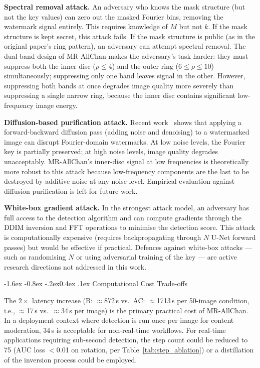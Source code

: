 \documentclass[10pt,twocolumn]{article}
\makeatletter
\renewcommand\subsection{\@startsection{subsection}{2}{\z@}%
  {-1.6ex \@plus -0.8ex \@minus -.2ex}{0.4ex \@plus .1ex}%
  {\normalfont\normalsize\itshape}}
\makeatother
\begin{document}
\textbf{Spectral removal attack.}
An adversary who knows the mask structure (but not the key values) can
zero out the masked Fourier bins, removing the watermark signal entirely.
This requires knowledge of $M$ but not $k$.
If the mask structure is kept secret, this attack fails.
If the mask structure is public (as in the original paper's ring pattern),
an adversary can attempt spectral removal.
The dual-band design of MR-AllChan makes the adversary's task harder:
they must suppress both the inner disc ($\rho \le 4$) and the outer ring
($6 \le \rho \le 10$) simultaneously; suppressing only one band leaves
signal in the other.
However, suppressing both bands at once degrades image quality more
severely than suppressing a single narrow ring, because the inner disc
contains significant low-frequency image energy.

\textbf{Diffusion-based purification attack.}
Recent work~\cite{zhao2023invisible} shows that applying a forward-backward
diffusion pass (adding noise and denoising) to a watermarked image can
disrupt Fourier-domain watermarks.
At low noise levels, the Fourier key is partially preserved; at high
noise levels, image quality degrades unacceptably.
MR-AllChan's inner-disc signal at low frequencies is theoretically more
robust to this attack because low-frequency components are the last to
be destroyed by additive noise at any noise level.
Empirical evaluation against diffusion purification is left for future work.

\textbf{White-box gradient attack.}
In the strongest attack model, an adversary has full access to the
detection algorithm and can compute gradients through the DDIM inversion
and FFT operations to minimise the detection score.
This attack is computationally expensive (requires backpropagating
through $N$ U-Net forward passes) but would be effective if practical.
Defences against white-box attacks --- such as randomising $N$ or
using adversarial training of the key --- are active research directions
not addressed in this work.

\subsection{Computational Cost Trade-offs}

The $2\times$ latency increase (B: $\approx$872\,s vs.\ AC: $\approx$1713\,s
per 50-image condition, i.e., $\approx$17\,s vs.\ $\approx$34\,s per image)
is the primary practical cost of MR-AllChan.
In a deployment context where detection is run once per image for content
moderation, 34\,s is acceptable for non-real-time workflows.
For real-time applications requiring sub-second detection, the step
count could be reduced to 75 (AUC loss $<$0.01 on rotation, per
Table~\ref{tab:step_ablation}) or a distillation of the inversion
process could be employed.
\end{document}
